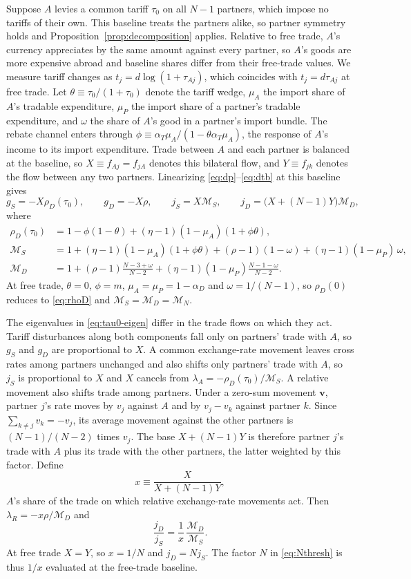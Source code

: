 \documentclass[11pt]{article}
\begin{document}
Suppose $A$ levies a common tariff $\tau_0$ on all $N-1$ partners, which impose no tariffs of their own. This baseline treats the partners alike, so partner symmetry holds and Proposition~\ref{prop:decomposition} applies. Relative to free trade, $A$'s currency appreciates by the same amount against every partner, so $A$'s goods are more expensive abroad and baseline shares differ from their free-trade values. We measure tariff changes as $t_j=d\log(1+\tau_{Aj})$, which coincides with $t_j=d\tau_{Aj}$ at free trade. Let $\theta\equiv\tau_0/(1+\tau_0)$ denote the tariff wedge, $\mu_A$ the import share of $A$'s tradable expenditure, $\mu_P$ the import share of a partner's tradable expenditure, and $\omega$ the share of $A$'s good in a partner's import bundle. The rebate channel enters through $\phi\equiv\alpha_T\mu_A/(1-\theta\alpha_T\mu_A)$, the response of $A$'s income to its import expenditure. Trade between $A$ and each partner is balanced at the baseline, so $X\equiv f_{Aj}=f_{jA}$ denotes this bilateral flow, and $Y\equiv f_{jk}$ denotes the flow between any two partners. Linearizing \eqref{eq:dp}--\eqref{eq:dtb} at this baseline gives
\begin{equation}
g_S=-X\rho_D(\tau_0),\qquad
g_D=-X\rho,\qquad
j_S=X\mathcal M_S,\qquad
j_D=\big(X+(N-1)Y\big)\mathcal M_D,
\label{eq:tau0-eigen}
\end{equation}
where
\begin{align*}
\rho_D(\tau_0)&=1-\phi(1-\theta)+(\eta-1)(1-\mu_A)(1+\phi\theta),\\
\mathcal M_S&=1+(\eta-1)(1-\mu_A)(1+\phi\theta)+(\rho-1)(1-\omega)+(\eta-1)(1-\mu_P)\,\omega,\\
\mathcal M_D&=1+(\rho-1)\frac{N-3+\omega}{N-2}+(\eta-1)(1-\mu_P)\frac{N-1-\omega}{N-2}.
\end{align*}
At free trade, $\theta=0$, $\phi=m$, $\mu_A=\mu_P=1-\alpha_D$ and $\omega=1/(N-1)$, so $\rho_D(0)$ reduces to \eqref{eq:rhoD} and $\mathcal M_S=\mathcal M_D=\mathcal M_N$.

The eigenvalues in \eqref{eq:tau0-eigen} differ in the trade flows on which they act. Tariff disturbances along both components fall only on partners' trade with $A$, so $g_S$ and $g_D$ are proportional to $X$. A common exchange-rate movement leaves cross rates among partners unchanged and also shifts only partners' trade with $A$, so $j_S$ is proportional to $X$ and $X$ cancels from $\lambda_A=-\rho_D(\tau_0)/\mathcal M_S$. A relative movement also shifts trade among partners. Under a zero-sum movement $\mathbf{v}$, partner $j$'s rate moves by $v_j$ against $A$ and by $v_j-v_k$ against partner $k$. Since $\sum_{k\neq j}v_k=-v_j$, its average movement against the other partners is $(N-1)/(N-2)$ times $v_j$. The base $X+(N-1)Y$ is therefore partner $j$'s trade with $A$ plus its trade with the other partners, the latter weighted by this factor. Define
\[
x\equiv\frac{X}{X+(N-1)Y},
\]
$A$'s share of the trade on which relative exchange-rate movements act. Then $\lambda_R=-x\rho/\mathcal M_D$ and
\[
\frac{j_D}{j_S}=\frac1x\,\frac{\mathcal M_D}{\mathcal M_S}.
\]
At free trade $X=Y$, so $x=1/N$ and $j_D=Nj_S$. The factor $N$ in \eqref{eq:Nthresh} is thus $1/x$ evaluated at the free-trade baseline.
\end{document}
